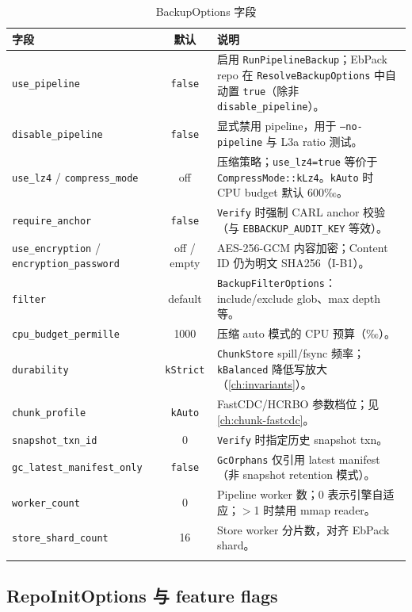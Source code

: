 \begin{longtable}{@{}p{3.8cm}cp{7.8cm}@{}}
\toprule
\textbf{字段} & \textbf{默认} & \textbf{说明} \\
\midrule
\endhead
\texttt{use\_pipeline} & \texttt{false} &
  启用 \texttt{RunPipelineBackup}；EbPack repo 在 \texttt{ResolveBackupOptions} 中自动置 \texttt{true}（除非 \texttt{disable\_pipeline}）。 \\
\texttt{disable\_pipeline} & \texttt{false} &
  显式禁用 pipeline，用于 \texttt{--no-pipeline} 与 L3a ratio 测试。 \\
\texttt{use\_lz4} / \texttt{compress\_mode} &
  off &
  压缩策略；\texttt{use\_lz4=true} 等价于 \texttt{CompressMode::kLz4}。\texttt{kAuto} 时 CPU budget 默认 600‰。 \\
\texttt{require\_anchor} & \texttt{false} &
  \texttt{Verify} 时强制 CARL anchor 校验（与 \texttt{EBBACKUP\_AUDIT\_KEY} 等效）。 \\
\texttt{use\_encryption} / \texttt{encryption\_password} &
  off / empty &
  AES-256-GCM 内容加密；Content ID 仍为明文 SHA256（I-B1）。 \\
\texttt{filter} & default &
  \texttt{BackupFilterOptions}：include/exclude glob、max depth 等。 \\
\texttt{cpu\_budget\_permille} & 1000 &
  压缩 auto 模式的 CPU 预算（‰）。 \\
\texttt{durability} & \texttt{kStrict} &
  \texttt{ChunkStore} spill/fsync 频率；\texttt{kBalanced} 降低写放大（\cref{ch:invariants}）。 \\
\texttt{chunk\_profile} & \texttt{kAuto} &
  FastCDC/HCRBO 参数档位；见 \cref{ch:chunk-fastcdc}。 \\
\texttt{snapshot\_txn\_id} & 0 &
  \texttt{Verify} 时指定历史 snapshot txn。 \\
\texttt{gc\_latest\_manifest\_only} & \texttt{false} &
  \texttt{GcOrphans} 仅引用 latest manifest（非 snapshot retention 模式）。 \\
\texttt{worker\_count} & 0 &
  Pipeline worker 数；0 表示引擎自适应；$>$1 时禁用 mmap reader。 \\
\texttt{store\_shard\_count} & 16 &
  Store worker 分片数，对齐 EbPack shard。 \\
\bottomrule
\caption{BackupOptions 字段}
\label{tab:backup-options}
\end{longtable}

\subsection{RepoInitOptions 与 feature flags}


